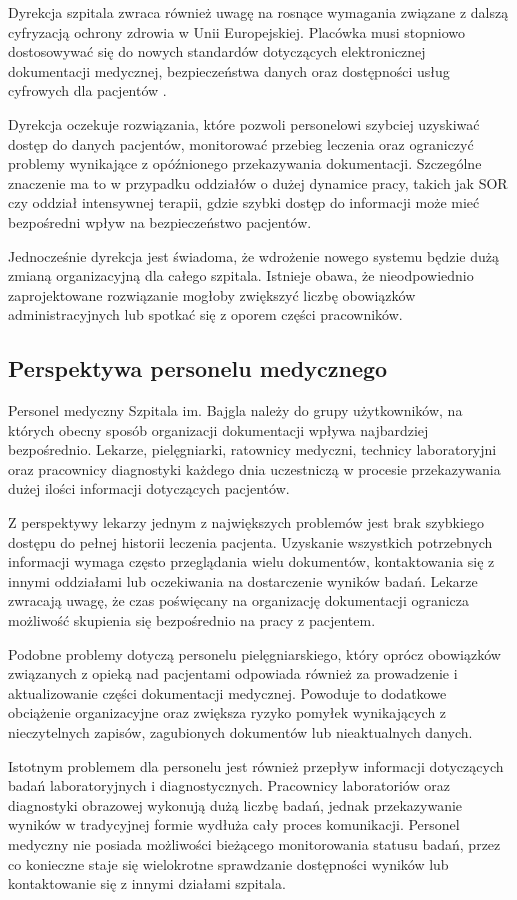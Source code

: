 Dyrekcja szpitala zwraca również uwagę na rosnące wymagania związane z dalszą cyfryzacją ochrony zdrowia w Unii Europejskiej. Placówka musi stopniowo dostosowywać się do nowych standardów dotyczących elektronicznej dokumentacji medycznej, bezpieczeństwa danych oraz dostępności usług cyfrowych dla pacjentów \cite{EU_eHealth_2024}.

Dyrekcja oczekuje rozwiązania, które pozwoli personelowi szybciej uzyskiwać dostęp do danych pacjentów, monitorować przebieg leczenia oraz ograniczyć problemy wynikające z opóźnionego przekazywania dokumentacji. Szczególne znaczenie ma to w przypadku oddziałów o dużej dynamice pracy, takich jak SOR czy oddział intensywnej terapii, gdzie szybki dostęp do informacji może mieć bezpośredni wpływ na bezpieczeństwo pacjentów.

Jednocześnie dyrekcja jest świadoma, że wdrożenie nowego systemu będzie dużą zmianą organizacyjną dla całego szpitala. Istnieje obawa, że nieodpowiednio zaprojektowane rozwiązanie mogłoby zwiększyć liczbę obowiązków administracyjnych lub spotkać się z oporem części pracowników. 
\subsection{Perspektywa personelu medycznego}
Personel medyczny Szpitala im. Bajgla należy do grupy użytkowników, na których obecny sposób organizacji dokumentacji wpływa najbardziej bezpośrednio. Lekarze, pielęgniarki, ratownicy medyczni, technicy laboratoryjni oraz pracownicy diagnostyki każdego dnia uczestniczą w procesie przekazywania dużej ilości informacji dotyczących pacjentów. 

Z perspektywy lekarzy jednym z największych problemów jest brak szybkiego dostępu do pełnej historii leczenia pacjenta. Uzyskanie wszystkich potrzebnych informacji wymaga często przeglądania wielu dokumentów, kontaktowania się z innymi oddziałami lub oczekiwania na dostarczenie wyników badań. Lekarze zwracają uwagę, że czas poświęcany na organizację dokumentacji ogranicza możliwość skupienia się bezpośrednio na pracy z pacjentem.

Podobne problemy dotyczą personelu pielęgniarskiego, który oprócz obowiązków związanych z opieką nad pacjentami odpowiada również za prowadzenie i aktualizowanie części dokumentacji medycznej. Powoduje to dodatkowe obciążenie organizacyjne oraz zwiększa ryzyko pomyłek wynikających z nieczytelnych zapisów, zagubionych dokumentów lub nieaktualnych danych.

Istotnym problemem dla personelu jest również przepływ informacji dotyczących badań laboratoryjnych i diagnostycznych. Pracownicy laboratoriów oraz diagnostyki obrazowej wykonują dużą liczbę badań, jednak przekazywanie wyników w tradycyjnej formie wydłuża cały proces komunikacji. Personel medyczny nie posiada możliwości bieżącego monitorowania statusu badań, przez co konieczne staje się wielokrotne sprawdzanie dostępności wyników lub kontaktowanie się z innymi działami szpitala. 

